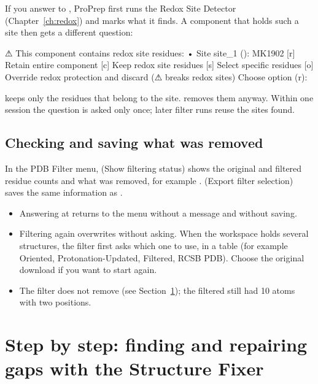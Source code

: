If you answer  to ,
ProPrep first runs the Redox Site Detector (Chapter~\ref{ch:redox}) and marks
what it finds. A component that holds such a site then gets a different
question:
\begin{screen}
⚠  This component contains redox site residues:
   • Site site_1 (): MK1902
[r] Retain entire component
[c] Keep redox site residues
[s] Select specific residues
[o] Override redox protection and discard (⚠ breaks redox sites)
Choose option (r):
\end{screen}
 keeps only the residues that belong to the site.  removes them
anyway. Within one session the question is asked only once; later filter runs
reuse the sites found.

\subsection{Checking and saving what was removed}

In the PDB Filter menu,  (Show filtering status) shows the original and
filtered residue counts and what was removed, for example
.  (Export filter selection) saves the
same information as .

\begin{watchout}
\begin{itemize}
  \item Answering  at 
        returns to the menu without a message and without saving.
  \item Filtering again overwrites  without
        asking. When the workspace holds several structures, the filter first
        asks which one to use, in a table (for example Oriented,
        Protonation-Updated, Filtered, RCSB PDB). Choose the original download
        if you want to start again.
  \item The filter does not remove  (see
        Section~\ref{sec:cleaning-fixer}); the filtered  still had
        10 atoms with two positions.
\end{itemize}
\end{watchout}

\section{Step by step: finding and repairing gaps with the Structure Fixer}
\label{sec:cleaning-fixer}

